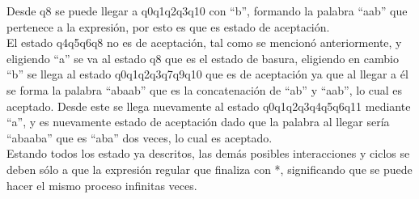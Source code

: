 \documentclass[11pt,letterpaper]{article}
\begin{document}
Desde q8 se puede llegar a q0q1q2q3q10 con “b”, formando la palabra “aab” que pertenece a la expresión, por esto es que es estado de aceptación. \\

El estado q4q5q6q8 no es de aceptación, tal como se mencionó anteriormente, y eligiendo “a” se va al estado q8 que es el estado de basura,  eligiendo en cambio “b” se llega al estado q0q1q2q3q7q9q10 que es de aceptación ya que al llegar a él se forma la palabra “abaab” que es la concatenación de “ab” y “aab”, lo cual es aceptado. Desde este se llega nuevamente al estado q0q1q2q3q4q5q6q11 mediante “a”, y es nuevamente estado de aceptación dado que la palabra al llegar sería “abaaba” que es “aba” dos veces, lo cual es aceptado. \\

Estando todos los estado ya descritos, las demás posibles  interacciones y ciclos se deben sólo a que la expresión regular que finaliza con *, significando que se puede hacer el mismo proceso infinitas veces.
\end{document}
